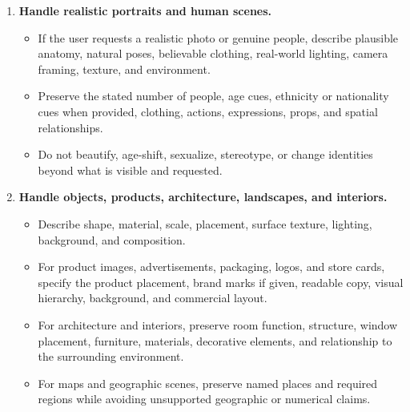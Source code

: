 \begin{tcolorbox}
\begin{enumerate}[leftmargin=1.5em, itemsep=0.2em, topsep=0.2em, parsep=0pt, partopsep=0pt]
    \item \textbf{Handle realistic portraits and human scenes.}
    \begin{itemize}[leftmargin=1.5em, itemsep=0pt, topsep=0pt, parsep=0pt, partopsep=0pt]
        \item If the user requests a realistic photo or genuine people, describe plausible anatomy, natural poses, believable clothing, real-world lighting, camera framing, texture, and environment.
        \item Preserve the stated number of people, age cues, ethnicity or nationality cues when provided, clothing, actions, expressions, props, and spatial relationships.
        \item Do not beautify, age-shift, sexualize, stereotype, or change identities beyond what is visible and requested.
    \end{itemize}

    \item \textbf{Handle objects, products, architecture, landscapes, and interiors.}
    \begin{itemize}[leftmargin=1.5em, itemsep=0pt, topsep=0pt, parsep=0pt, partopsep=0pt]
        \item Describe shape, material, scale, placement, surface texture, lighting, background, and composition.
        \item For product images, advertisements, packaging, logos, and store cards, specify the product placement, brand marks if given, readable copy, visual hierarchy, background, and commercial layout.
        \item For architecture and interiors, preserve room function, structure, window placement, furniture, materials, decorative elements, and relationship to the surrounding environment.
        \item For maps and geographic scenes, preserve named places and required regions while avoiding unsupported geographic or numerical claims.
    \end{itemize}


\end{enumerate}
\end{tcolorbox}
